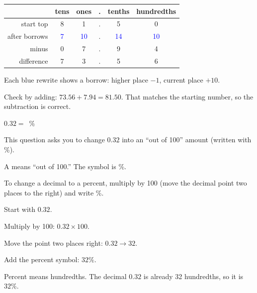 \begin{center}
\begin{tabular}{r@{\quad}ccccc}
 & tens & ones & . & tenths & hundredths\\ \hline
start top & 8 & 1 & . & 5 & 0\\
after borrows & \textcolor{blue}{7} & \textcolor{blue}{10} & . & \textcolor{blue}{14} & \textcolor{blue}{10}\\ \hline
minus & 0 & 7 & . & 9 & 4\\ \hline
difference & 7 & 3 & . & 5 & 6\\
\end{tabular}

\smallskip
Each blue rewrite shows a borrow: higher place $-1$, current place $+10$.
\end{center}


Check by adding: $73.56 + 7.94 = 81.50$. That matches the starting number, so the
subtraction is correct.


$0.32 = $\ansblank[1.8cm]\ \%


This question asks you to change $0.32$ into an ``out of 100'' amount (written with \%).

\begin{words}
  \item A means ``out of 100.'' The symbol is \%.
  \item To change a decimal to a percent, multiply by 100 (move the decimal point
        two places to the right) and write \%.
\end{words}

\begin{steps}
  \item Start with $0.32$.
  \item Multiply by 100: $0.32 \times 100$.
  \item Move the point two places right: $0.32 \to 32$.
  \item Add the percent symbol: $32\%$.
\end{steps}


Percent means hundredths. The decimal $0.32$ is already 32 hundredths, so it is $32\%$.

